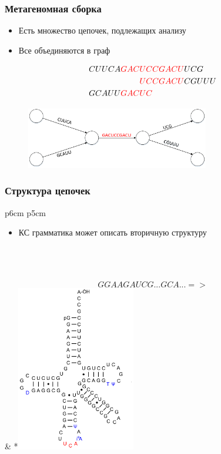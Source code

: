 \documentclass{beamer}
\begin{document}
    \begin{frame}
        \frametitle{Метагеномная сборка}
        \begin{itemize}
            \item Есть множество цепочек, подлежащих анализу
            \item Все объединяются в граф
        \end{itemize}
        
        \begin{figure}[t]
            \begin{align*}
                CUUCA {\color{red} GAC} &{\color{red} UCCGACU}  UCG \\
                                        &{\color{red} UCCGACU} CGUUU \\
                GCAUU {\color{red} GAC} &{\color{red} UC}
            \end{align*}
        \end{figure}
        
        \begin{figure}[b]
            \centering
            \includegraphics[width=8cm]{pictures/methagenEx.pdf}  
        \end{figure}
          
        
    \end{frame}

    \begin{frame}
    \frametitle{Структура цепочек}
    \begin{tabular}{p{6cm} p{5cm}}
        \begin{itemize}
            \item КС грамматика может описать вторичную структуру
        \end{itemize}
        \\
        \\
        \\
        $$
        GGAAGAUCG...GCA...  =>
        $$
        &
        *{\includegraphics[width=5.2cm]{pictures/TRNA.png}}
    \end{tabular}  
    
    \end{frame}
    
\end{document}
